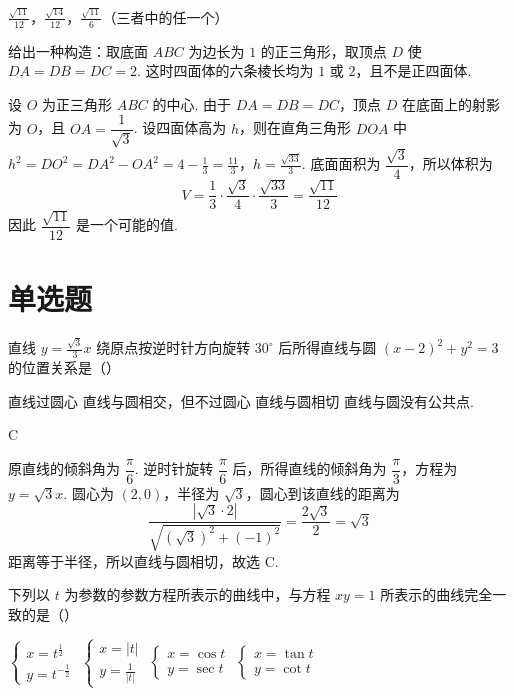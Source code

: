 \documentclass[UTF8,a4paper,oneside,11pt]{ctexbook}
\begin{document}
\begin{answer}
\(\frac{\sqrt{11}}{12}\)，\(\frac{\sqrt{14}}{12}\)，\(\frac{\sqrt{11}}{6}\)（三者中的任一个）
\end{answer}

\begin{solution}
给出一种构造：取底面 \(ABC\) 为边长为 \(1\) 的正三角形，取顶点 \(D\) 使 \(DA=DB=DC=2\). 这时四面体的六条棱长均为 \(1\) 或 \(2\)，且不是正四面体.

设 \(O\) 为正三角形 \(ABC\) 的中心. 由于 \(DA=DB=DC\)，顶点 \(D\) 在底面上的射影为 \(O\)，且 \(OA=\dfrac1{\sqrt3}\). 设四面体高为 \(h\)，则在直角三角形 \(DOA\) 中
\(h^2=DO^2=DA^2-OA^2=4-\frac13=\frac{11}{3}\)，\(h=\frac{\sqrt{33}}3\).
底面面积为 \(\dfrac{\sqrt3}{4}\)，所以体积为
\[
V=\frac13\cdot\frac{\sqrt3}{4}\cdot\frac{\sqrt{33}}3=\frac{\sqrt{11}}{12}
\]
因此 \(\dfrac{\sqrt{11}}{12}\) 是一个可能的值.
\end{solution}

\section{单选题}

\begin{problem}
直线 \(y = \frac{\sqrt{3}}{3}x\) 绕原点按逆时针方向旋转 \(30^\circ\) 后所得直线与圆 \(\left( x - 2 \right)^2 + y^2 = 3\) 的位置关系是（\quad）

\choices
    {直线过圆心}
    {直线与圆相交，但不过圆心}
    {直线与圆相切}
    {直线与圆没有公共点.}
\end{problem}

\begin{answer}
C
\end{answer}

\begin{solution}
原直线的倾斜角为 \(\dfrac\pi6\). 逆时针旋转 \(\dfrac\pi6\) 后，所得直线的倾斜角为 \(\dfrac\pi3\)，方程为 \(y=\sqrt3x\). 圆心为 \((2,0)\)，半径为 \(\sqrt3\)，圆心到该直线的距离为
\[
\frac{|\sqrt3\cdot2|}{\sqrt{(\sqrt3)^2+(-1)^2}}=\frac{2\sqrt3}{2}=\sqrt3
\]
距离等于半径，所以直线与圆相切，故选 C.
\end{solution}

\begin{problem}
下列以 \(t\) 为参数的参数方程所表示的曲线中，与方程 \(xy = 1\) 所表示的曲线完全一致的是（\quad）

\choices
    {\(\begin{cases}
        x = t^{\frac{1}{2}} \\
        y = t^{-\frac{1}{2}}
    \end{cases}\)}
    {\(\begin{cases}
        x = |t| \\
        y = \frac{1}{|t|}
    \end{cases}\)}
    {\(\begin{cases}
        x = \cos t \\
        y = \sec t
    \end{cases}\)}
    {\(\begin{cases}
        x = \tan t \\
        y = \cot t
    \end{cases}\)}
\end{problem}
\end{document}
